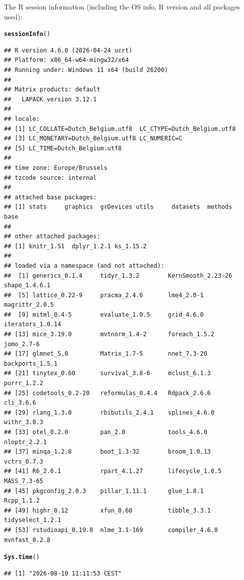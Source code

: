 \documentclass{article}\usepackage[]{graphicx}\usepackage[]{xcolor}
\makeatletter
\newcommand{\hldef}[1]{\textcolor[rgb]{0.345,0.345,0.345}{#1}}%
\newcommand{\hlkwd}[1]{\textcolor[rgb]{0.737,0.353,0.396}{\textbf{#1}}}%
\newenvironment{kframe}{%
 \def\at@end@of@kframe{}%
 \ifinner\ifhmode%
  \def\at@end@of@kframe{\end{minipage}}%
  \begin{minipage}{\columnwidth}%
 \fi\fi%
 \def\FrameCommand##1{\hskip\@totalleftmargin \hskip-\fboxsep
 \colorbox{shadecolor}{##1}\hskip-\fboxsep
     \hskip-\linewidth \hskip-\@totalleftmargin \hskip\columnwidth}%
 \MakeFramed {\advance\hsize-\width
   \@totalleftmargin\z@ \linewidth\hsize
   \@setminipage}}%
 {\par\unskip\endMakeFramed%
 \at@end@of@kframe}
\newenvironment{knitrout}{}{} %
\makeatother
\begin{document}
The R session information (including the OS info, R version and all
packages used):

\begin{knitrout}
\color{fgcolor}\begin{kframe}
\begin{alltt}
\hlkwd{sessionInfo}\hldef{()}
\end{alltt}
\begin{verbatim}
## R version 4.6.0 (2026-04-24 ucrt)
## Platform: x86_64-w64-mingw32/x64
## Running under: Windows 11 x64 (build 26200)
## 
## Matrix products: default
##   LAPACK version 3.12.1
## 
## locale:
## [1] LC_COLLATE=Dutch_Belgium.utf8  LC_CTYPE=Dutch_Belgium.utf8   
## [3] LC_MONETARY=Dutch_Belgium.utf8 LC_NUMERIC=C                  
## [5] LC_TIME=Dutch_Belgium.utf8    
## 
## time zone: Europe/Brussels
## tzcode source: internal
## 
## attached base packages:
## [1] stats     graphics  grDevices utils     datasets  methods   base     
## 
## other attached packages:
## [1] knitr_1.51  dplyr_1.2.1 ks_1.15.2  
## 
## loaded via a namespace (and not attached):
##  [1] generics_0.1.4     tidyr_1.3.2        KernSmooth_2.23-26 shape_1.4.6.1     
##  [5] lattice_0.22-9     pracma_2.4.6       lme4_2.0-1         magrittr_2.0.5    
##  [9] mitml_0.4-5        evaluate_1.0.5     grid_4.6.0         iterators_1.0.14  
## [13] mice_3.19.0        mvtnorm_1.4-2      foreach_1.5.2      jomo_2.7-6        
## [17] glmnet_5.0         Matrix_1.7-5       nnet_7.3-20        backports_1.5.1   
## [21] tinytex_0.60       survival_3.8-6     mclust_6.1.3       purrr_1.2.2       
## [25] codetools_0.2-20   reformulas_0.4.4   Rdpack_2.6.6       cli_3.6.6         
## [29] rlang_1.3.0        rbibutils_2.4.1    splines_4.6.0      withr_3.0.3       
## [33] otel_0.2.0         pan_2.0            tools_4.6.0        nloptr_2.2.1      
## [37] minqa_1.2.8        boot_1.3-32        broom_1.0.13       vctrs_0.7.3       
## [41] R6_2.6.1           rpart_4.1.27       lifecycle_1.0.5    MASS_7.3-65       
## [45] pkgconfig_2.0.3    pillar_1.11.1      glue_1.8.1         Rcpp_1.1.2        
## [49] highr_0.12         xfun_0.60          tibble_3.3.1       tidyselect_1.2.1  
## [53] rstudioapi_0.19.0  nlme_3.1-169       compiler_4.6.0     mvnfast_0.2.8
\end{verbatim}
\begin{alltt}
\hlkwd{Sys.time}\hldef{()}
\end{alltt}
\begin{verbatim}
## [1] "2026-08-10 11:11:53 CEST"
\end{verbatim}
\end{kframe}
\end{knitrout}
\end{document}
